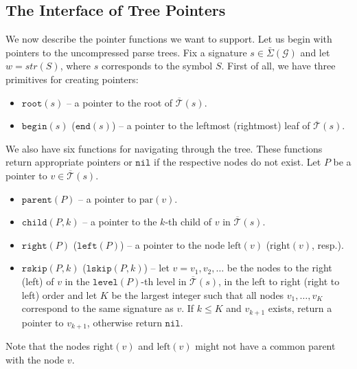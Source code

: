 \documentclass[a4paper]{article}
\theoremstyle{remark}
\newcommand{\sigs}{\bar{\Sigma}}
\newcommand{\str}{w}
\newcommand{\grammar}{\mathcal{G}}
\newcommand{\sstr}{\textit{str}}
\newcommand{\ustree}{\mathcal{\overline{T}}}
\newcommand{\uspar}{\mathrm{par}}
\newcommand{\usleft}{\mathrm{left}}
\newcommand{\usright}{\mathrm{right}}
\newcommand{\itroot}{\mathtt{root}}
\newcommand{\itbegin}{\mathtt{begin}}
\newcommand{\itend}{\mathtt{end}}
\newcommand{\itparent}{\mathtt{parent}}
\newcommand{\itchild}{\mathtt{child}}
\newcommand{\itlevel}{\mathtt{level}}
\newcommand{\itleft}{\mathtt{left}}
\newcommand{\itright}{\mathtt{right}}
\newcommand{\itnil}{\mathtt{nil}}
\newcommand{\itrskip}{\mathtt{rskip}}
\newcommand{\itlskip}{\mathtt{lskip}}
\begin{document}
\subsection{The Interface of Tree Pointers}
We now describe the pointer functions we want to support.
Let us begin with pointers to the uncompressed parse trees.
Fix a signature $s\in\sigs(\grammar)$ and
let $\str=\sstr(S)$, where $s$ corresponds to the symbol $S$.
First of all, we have three primitives for creating pointers:
\begin{itemize}
  \item $\itroot(s)$ -- a pointer to the root of $\ustree(s)$.
  \item $\itbegin(s)$ ($\itend(s)$) -- a pointer to the leftmost (rightmost) leaf of $\ustree(s)$.
\end{itemize}
We also have six functions for navigating through the tree.
These functions return appropriate pointers or $\itnil$ if the respective nodes do not exist.
Let $P$ be a pointer to $v\in \ustree(s)$.
\begin{itemize}
  \item $\itparent(P)$ -- a pointer to $\uspar(v)$.
  \item $\itchild(P,k)$ -- a pointer to the $k$-th child of $v$ in $\ustree(s)$.
  \item $\itright(P)$ ($\itleft(P)$) -- a pointer to the node $\usleft(v)$ ($\usright(v)$, resp.).
  \item $\itrskip(P,k)$ ($\itlskip(P,k)$) --
    let $v=v_1,v_2,\ldots$ be the nodes to the right (left) of $v$
    in the $\itlevel(P)$-th level in $\ustree(s)$, in the left to right (right to left) order
    and let $K$ be the largest integer such that
    all nodes $v_1,\ldots,v_K$ correspond to the same signature as $v$.
    If $k\leq K$ and $v_{k+1}$ exists, return a pointer to $v_{k+1}$,
    otherwise return $\itnil$.

\end{itemize}
Note that the nodes $\usright(v)$ and $\usleft(v)$ might not have a common parent with the node $v$.
\end{document}
